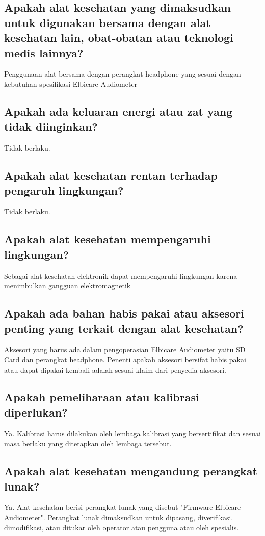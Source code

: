 \documentclass[11pt,a4paper,twoside,onecolumn]{book}
\begin{document}
			\subsection{Apakah alat kesehatan yang dimaksudkan untuk digunakan bersama dengan alat kesehatan lain, obat-obatan atau teknologi medis lainnya?}
			Penggunaan alat bersama dengan perangkat headphone yang sesuai dengan kebutuhan spesifikasi Elbicare Audiometer
			
			\subsection{Apakah ada keluaran energi atau zat yang tidak diinginkan?}
			Tidak berlaku.
			
			\subsection{Apakah alat kesehatan rentan terhadap pengaruh lingkungan?}
			Tidak berlaku.
			
			\subsection{Apakah alat kesehatan mempengaruhi lingkungan?}
			Sebagai alat kesehatan elektronik dapat mempengaruhi lingkungan karena menimbulkan gangguan elektromagnetik
			
			\subsection{Apakah ada bahan habis pakai atau aksesori penting yang terkait dengan alat kesehatan?}
			Aksesori yang harus ada dalam pengoperasian Elbicare Audiometer yaitu SD Card dan perangkat headphone. Penenti apakah aksesori bersifat habis pakai atau dapat dipakai kembali adalah sesuai klaim dari penyedia aksesori.
			
			\subsection{Apakah pemeliharaan atau kalibrasi diperlukan?}
			Ya. Kalibrasi harus dilakukan oleh lembaga kalibrasi yang bersertifikat dan sesuai masa berlaku yang ditetapkan oleh lembaga tersebut.
			
			\subsection{Apakah alat kesehatan mengandung perangkat lunak?}
			Ya. Alat kesehatan berisi perangkat lunak yang disebut "Firmware Elbicare Audiometer". Perangkat lunak dimaksudkan untuk dipasang, diverifikasi. dimodifikasi, atau ditukar oleh operator atau pengguna atau oleh spesialis.
			
\end{document}
